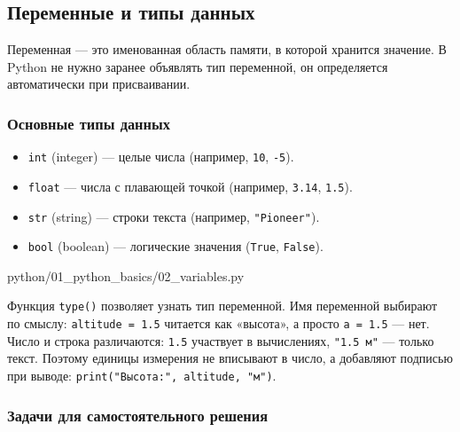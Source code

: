 \subsection{Переменные и типы данных}

Переменная — это именованная область памяти, в которой хранится значение. В Python не нужно заранее объявлять тип переменной, он определяется автоматически при присваивании.

\subsubsection*{Основные типы данных}
\begin{itemize}
    \item \texttt{int} (integer) — целые числа (например, \texttt{10}, \texttt{-5}).
    \item \texttt{float} — числа с плавающей точкой (например, \texttt{3.14}, \texttt{1.5}).
    \item \texttt{str} (string) — строки текста (например, \texttt{"Pioneer"}).
    \item \texttt{bool} (boolean) — логические значения (\texttt{True}, \texttt{False}).
\end{itemize}

\begin{codefile}[python]{python/01_python_basics/02_variables.py}
\end{codefile}

Функция \texttt{type()} позволяет узнать тип переменной. Имя переменной выбирают по смыслу: \texttt{altitude = 1.5} читается как «высота», а просто \texttt{a = 1.5} --- нет. Число и строка различаются: \texttt{1.5} участвует в вычислениях, \texttt{"1.5 м"} --- только текст. Поэтому единицы измерения не вписывают в число, а добавляют подписью при выводе: \verb|print("Высота:", altitude, "м")|.

\subsubsection*{Задачи для самостоятельного решения}

